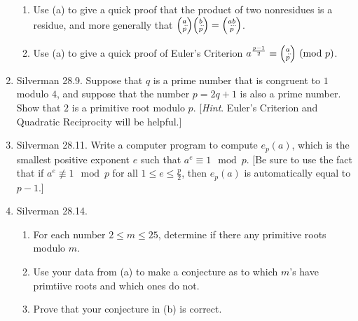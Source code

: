 \documentclass[10pt]{article}
\begin{document}
\begin{enumerate}[itemsep=1em,label=\Alph*.,leftmargin=*]
\begin{enumerate}[itemsep=1em,label=(\alph*),leftmargin=*]
            \item Use (a) to give a quick proof that the product of two nonresidues is a residue, and more generally that $\tlegendre{a}{p}\tlegendre{b}{p}=\tlegendre{ab}{p}$. 
            \item Use (a) to give a quick proof of Euler's Criterion $a^\frac{p-1}{2}\equiv \tlegendre{a}{p} \mod{p}$. 
        \end{enumerate}


\pagebreak
\item Silverman 28.9. Suppose that $q$ is a prime number that is congruent to $1$ modulo $4$, and suppose that the number $p=2q+1$ is also a prime number.
    Show that $2$ is a primitive root modulo $p$. [\textit{Hint}. Euler's Criterion and Quadratic Reciprocity will be helpful.]


\pagebreak
\item Silverman 28.11. Write a computer program to compute $e_p(a)$, which is the smallest positive exponent $e$ such that $a^e \equiv 1 \mod{p}$. [Be sure to use the fact that if $a^e \not\equiv 1 \mod{p}$ for all $1 \leq e \leq \frac{p}{2}$, then $e_p(a)$ is automatically equal to $p-1$.]


\pagebreak
\item Silverman 28.14.
        \begin{enumerate}[itemsep=1em,label=(\alph*),leftmargin=*]
    \item For each number $2 \leq m \leq 25$, determine if there any primitive roots modulo $m$. 
    \item Use your data from (a) to make a conjecture as to which $m$'s have primtiive roots and which ones do not. 
    \item Prove that your conjecture in (b) is correct. 
\end{enumerate}

\end{enumerate}
\end{document}
